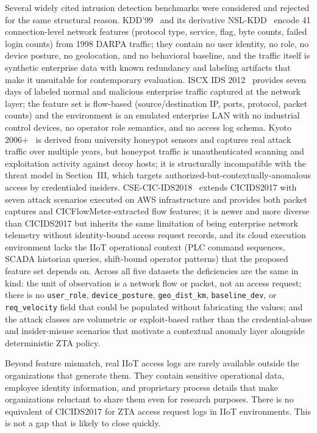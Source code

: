 \documentclass[conference]{IEEEtran}
\begin{document}
Several widely cited intrusion detection benchmarks were considered and rejected for the same structural reason. KDD'99~\cite{kddcup99} and its derivative NSL-KDD~\cite{nslkdd} encode 41 connection-level network features (protocol type, service, flag, byte counts, failed login counts) from 1998 DARPA traffic; they contain no user identity, no role, no device posture, no geolocation, and no behavioral baseline, and the traffic itself is synthetic enterprise data with known redundancy and labeling artifacts that make it unsuitable for contemporary evaluation. ISCX IDS 2012~\cite{iscxids2012} provides seven days of labeled normal and malicious enterprise traffic captured at the network layer; the feature set is flow-based (source/destination IP, ports, protocol, packet counts) and the environment is an emulated enterprise LAN with no industrial control devices, no operator role semantics, and no access log schema. Kyoto 2006+~\cite{kyoto2006} is derived from university honeypot sensors and captures real attack traffic over multiple years, but honeypot traffic is unauthenticated scanning and exploitation activity against decoy hosts; it is structurally incompatible with the threat model in Section~III, which targets authorized-but-contextually-anomalous access by credentialed insiders. CSE-CIC-IDS2018~\cite{csecicids2018} extends CICIDS2017 with seven attack scenarios executed on AWS infrastructure and provides both packet captures and CICFlowMeter-extracted flow features; it is newer and more diverse than CICIDS2017 but inherits the same limitation of being enterprise network telemetry without identity-bound access request records, and its cloud execution environment lacks the IIoT operational context (PLC command sequences, SCADA historian queries, shift-bound operator patterns) that the proposed feature set depends on. Across all five datasets the deficiencies are the same in kind: the unit of observation is a network flow or packet, not an access request; there is no \texttt{user\_role}, \texttt{device\_posture}, \texttt{geo\_dist\_km}, \texttt{baseline\_dev}, or \texttt{req\_velocity} field that could be populated without fabricating the values; and the attack classes are volumetric or exploit-based rather than the credential-abuse and insider-misuse scenarios that motivate a contextual anomaly layer alongside deterministic ZTA policy.

Beyond feature mismatch, real IIoT access logs are rarely available outside the organizations that generate them. They contain sensitive operational data, employee identity information, and proprietary process details that make organizations reluctant to share them even for research purposes. There is no equivalent of CICIDS2017 for ZTA access request logs in IIoT environments. This is not a gap that is likely to close quickly.
\end{document}
